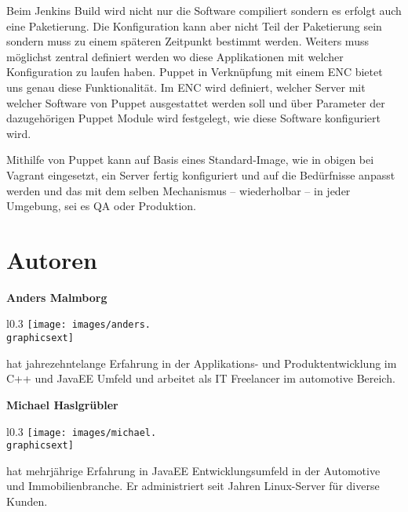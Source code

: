 \documentclass[12pt,a4paper,ngerman]{article}
\begin{document}
Beim Jenkins Build wird nicht nur die Software compiliert sondern es erfolgt auch eine Paketierung.  Die Konfiguration kann aber nicht Teil der Paketierung sein sondern muss zu einem späteren Zeitpunkt bestimmt werden. Weiters muss möglichst zentral definiert werden wo diese Applikationen mit welcher Konfiguration zu laufen haben. Puppet in Verknüpfung mit einem ENC bietet uns genau diese Funktionalität. Im ENC wird definiert, welcher Server mit welcher Software von Puppet ausgestattet werden soll und über Parameter der dazugehörigen Puppet Module wird festgelegt, wie diese Software konfiguriert wird. 

Mithilfe von Puppet kann auf Basis eines Standard-Image, wie in obigen bei Vagrant eingesetzt, ein Server fertig konfiguriert und auf die Bedürfnisse anpasst werden und das mit dem selben Mechanismus -- wiederholbar -- in jeder Umgebung, sei es QA oder Produktion.

\section*{Autoren}

\newcommand{\authorboxheight}{5cm}
\begin{minipage}[t][\authorboxheight]{0.45\textwidth}
\textbf{Anders Malmborg}
\vskip0.3cm
\begin{wrapfigure}{l}{0.3\textwidth}
\vspace{-20pt}
\texttt{[image: images/anders.\\graphicsext]}
\vspace{-20pt}
\end{wrapfigure}
hat jahrezehntelange Erfahrung in der Applikations- und Produktentwicklung im C++ und JavaEE Umfeld und arbeitet als IT Freelancer im automotive Bereich. 
\end{minipage}
\hspace{0.1\textwidth}
\begin{minipage}[t][\authorboxheight]{0.45\textwidth}
\textbf{Michael Haslgrübler}
\vskip0.3cm
\begin{wrapfigure}{l}{0.3\textwidth}
\vspace{-20pt}
\texttt{[image: images/michael.\\graphicsext]}
\vspace{-20pt}
\end{wrapfigure}
hat mehrjährige Erfahrung in JavaEE Entwicklungsumfeld in der Automotive und Immobilienbranche. Er administriert seit Jahren Linux-Server für diverse Kunden.
\end{minipage}



\end{document}
